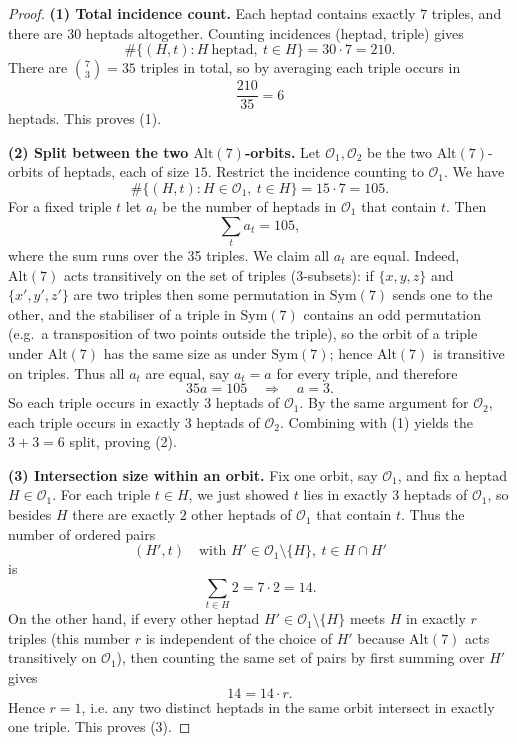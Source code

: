 \documentclass[12pt,a4paper,openany]{book}
\begin{document}
\begin{proof}
\textbf{(1) Total incidence count.}
Each heptad contains exactly $7$ triples, and there are $30$ heptads altogether.
Counting incidences (heptad, triple) gives
\[
\#\{(H,t) : H\ \text{heptad},\ t\in H\} = 30\cdot 7 = 210.
\]
There are $\binom{7}{3}=35$ triples in total, so by averaging each triple
occurs in
\[
\frac{210}{35}=6
\]
heptads. This proves (1).

\medskip
\textbf{(2) Split between the two $\mathrm{Alt}(7)$-orbits.}
Let $\mathcal O_1,\mathcal O_2$ be the two $\mathrm{Alt}(7)$-orbits of heptads,
each of size $15$. Restrict the incidence counting to $\mathcal O_1$. We have
\[
\#\{(H,t) : H\in\mathcal O_1,\ t\in H\} = 15\cdot 7 = 105.
\]
For a fixed triple $t$ let $a_t$ be the number of heptads in $\mathcal O_1$
that contain $t$. Then
\[
\sum_{t} a_t = 105,
\]
where the sum runs over the 35 triples. We claim all $a_t$ are equal. Indeed,
$\mathrm{Alt}(7)$ acts transitively on the set of triples (3-subsets): if
$\{x,y,z\}$ and $\{x',y',z'\}$ are two triples then some permutation in
$\mathrm{Sym}(7)$ sends one to the other, and the stabiliser of a triple in
$\mathrm{Sym}(7)$ contains an odd permutation (e.g.\ a transposition of two
points outside the triple), so the orbit of a triple under $\mathrm{Alt}(7)$
has the same size as under $\mathrm{Sym}(7)$; hence $\mathrm{Alt}(7)$ is
transitive on triples. Thus all $a_t$ are equal, say $a_t=a$ for every triple,
and therefore
\[
35a = 105 \quad\Rightarrow\quad a=3.
\]
So each triple occurs in exactly $3$ heptads of $\mathcal O_1$. By the same
argument for $\mathcal O_2$, each triple occurs in exactly $3$ heptads of
$\mathcal O_2$. Combining with (1) yields the $3+3=6$ split, proving (2).

\medskip
\textbf{(3) Intersection size within an orbit.}
Fix one orbit, say $\mathcal O_1$, and fix a heptad $H\in\mathcal O_1$.
For each triple $t\in H$, we just showed $t$ lies in exactly $3$ heptads of
$\mathcal O_1$, so besides $H$ there are exactly $2$ other heptads of
$\mathcal O_1$ that contain $t$. Thus the number of ordered pairs
\[
(H',t) \quad\text{with } H'\in\mathcal O_1\setminus\{H\},\ t\in H\cap H'
\]
is
\[
\sum_{t\in H} 2 = 7\cdot 2 = 14.
\]
On the other hand, if every other heptad $H'\in\mathcal O_1\setminus\{H\}$
meets $H$ in exactly $r$ triples (this number $r$ is independent of the choice
of $H'$ because $\mathrm{Alt}(7)$ acts transitively on $\mathcal O_1$), then
counting the same set of pairs by first summing over $H'$ gives
\[
14 = 14\cdot r.
\]
Hence $r=1$, i.e. any two distinct heptads in the same orbit intersect in
exactly one triple. This proves (3).
\end{proof}
\bigskip
\end{document}
